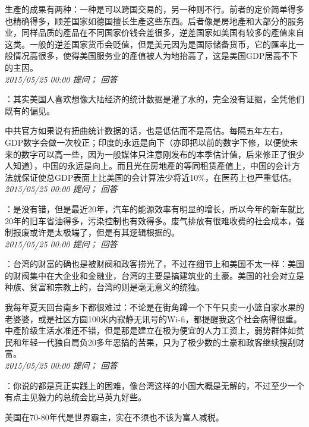 \documentclass[twocolumn]{ctexart}
\begin{document}
生產的成果有两种：一种是可以跨国交易的，另一种则不行。前者的定价简单得多也精确得多，顺差国家如德国擅长生產这些东西。后者像是房地產和大部分的服务业，同样品质的產品在不同国家价钱会差很多，逆差国家如美国有较多的產值来自这类。一般的逆差国家货币会贬值，但是美元因为是国际储备货币，它的匯率比一般情况高很多，使得美国服务业的產值被人为地抬高了，这是美国GDP居高不下的主因。\\

\textit{\hfill\noindent\small 2015/05/25 00:00 提问； 回答}

：其实美国人喜欢想像大陆经济的统计数据是灌了水的，完全没有证据，全凭他们既有的偏见。

中共官方如果说有扭曲统计数据的话，也是低估而不是高估。每隔五年左右，GDP数字会做一次校正；印度的永远是向下（亦即把以前的数字下修，以便使未来的数字可以高一些，因为一般媒体只注意刚发布的本季估计值，后来修正了很少人知道），中国的永远是向上。而且光在房地產的等同租赁產值上，中国的会计方法就保证使总GDP表面上比美国的会计算法少将近10\%，在医药上也严重低估。\\

\textit{\hfill\noindent\small 2015/05/25 00:00 提问； 回答}

：是没有错，但是最近20年，汽车的能源效率有明显的增长，所以今年的新车就比20年的旧车省油得多，污染控制也有效得多。废气排放有很难收费的社会成本，强制报废或许是太极端了，但是有其逻辑根据的。\\

\textit{\hfill\noindent\small 2015/05/25 00:00 提问； 回答}

：台湾的财富的确也是被财阀和政客捞光了，不过在细节上和美国不太一样：美国的财阀集中在大企业和金融业，台湾的主要是搞建筑业的土豪。美国的社会对立是种族、贫富和宗教上的，台湾的则是毫无意义的统独。

我每年夏天回台南乡下都很难过：不论是在街角蹲一个下午只卖一小篮自家水果的老婆婆，或是社区方圆100米内寂静无讯号的Wi-fi，都提醒我这个社会病得很重。中產阶级生活水准还不错，但是那是建立在极为便宜的人力工资上，弱势群体如贫民和年轻一代独自肩负20多年恶搞的苦果，只为了极少数的土豪和政客继续搜刮财富。\\

\textit{\hfill\noindent\small 2015/05/25 00:00 提问； 回答}

：你说的都是真正实践上的困难，像台湾这样的小国大概是无解的，不过至少一个有点主见毅力的总统会比马英九好些。

美国在70-80年代是世界霸主，实在不须也不该为富人减税。
\end{document}

